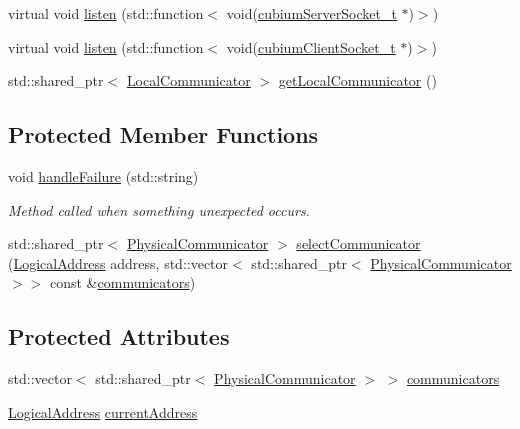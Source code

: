 \begin{DoxyCompactItemize}
\item 
virtual void \hyperlink{classSpaCommunicator_ae1634fbdc0d08ca8dd1dd5ba6fa18bbe}{listen} (std\+::function$<$ void(\hyperlink{structcubiumServerSocket__t}{cubium\+Server\+Socket\+\_\+t} $\ast$)$>$)
\item 
virtual void \hyperlink{classSpaCommunicator_af7af26aa5e511a039c036fcbb03735c6}{listen} (std\+::function$<$ void(\hyperlink{structcubiumClientSocket__t}{cubium\+Client\+Socket\+\_\+t} $\ast$)$>$)
\item 
std\+::shared\+\_\+ptr$<$ \hyperlink{classLocalCommunicator}{Local\+Communicator} $>$ \hyperlink{classSpaCommunicator_adcd23698bae79308a28709c60288680e}{get\+Local\+Communicator} ()
\end{DoxyCompactItemize}
\subsection*{Protected Member Functions}
\begin{DoxyCompactItemize}
\item 
void \hyperlink{classSpaCommunicator_aeacd2e5d7178f34cec7701136a6821e7}{handle\+Failure} (std\+::string)
\begin{DoxyCompactList}\small\item\em Method called when something unexpected occurs. \end{DoxyCompactList}\item 
std\+::shared\+\_\+ptr$<$ \hyperlink{classPhysicalCommunicator}{Physical\+Communicator} $>$ \hyperlink{classSpaCommunicator_a063bb5ab2b09a46dbf296d151edae289}{select\+Communicator} (\hyperlink{structLogicalAddress}{Logical\+Address} address, std\+::vector$<$ std\+::shared\+\_\+ptr$<$ \hyperlink{classPhysicalCommunicator}{Physical\+Communicator} $>$$>$ const \&\hyperlink{classSpaCommunicator_acafe7d632d63d55ea081f8a61647243a}{communicators})
\end{DoxyCompactItemize}
\subsection*{Protected Attributes}
\begin{DoxyCompactItemize}
\item 
std\+::vector$<$ std\+::shared\+\_\+ptr$<$ \hyperlink{classPhysicalCommunicator}{Physical\+Communicator} $>$ $>$ \hyperlink{classSpaCommunicator_acafe7d632d63d55ea081f8a61647243a}{communicators}
\item 
\hyperlink{structLogicalAddress}{Logical\+Address} \hyperlink{classSpaCommunicator_a6c00e876564bddf214695d067c20a1f4}{current\+Address}
\end{DoxyCompactItemize}


